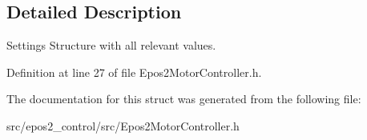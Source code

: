 \subsection{Detailed Description}
Settings Structure with all relevant values. 

Definition at line 27 of file Epos2\-Motor\-Controller.\-h.



The documentation for this struct was generated from the following file\-:\begin{DoxyCompactItemize}
\item 
src/epos2\-\_\-control/src/Epos2\-Motor\-Controller.\-h\end{DoxyCompactItemize}
